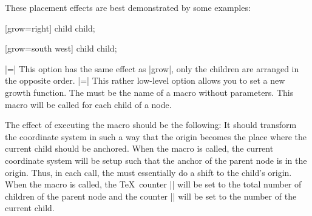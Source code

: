 \begin{itemize}
  These placement effects are best demonstrated by some examples:
\begin{codeexample}[]
\tikz {} [grow=right] child child;
\end{codeexample}

\begin{codeexample}[]
\tikz {} [grow=south west] child child;
\end{codeexample}

\begin{codeexample}[]
\end{codeexample}

\begin{codeexample}[]
\end{codeexample}

\begin{codeexample}[]
\end{codeexample}

  |=|
  This option has the same effect as |grow|, only the children are
  arranged in the opposite order.
  |=|
  This rather low-level option allows you to set a new growth
  function. The  must be the name of a macro without
  parameters. This macro will be called for each child of a node.

  The effect of executing the macro should be the following: It should
  transform the coordinate system in such a way that the origin
  becomes the place where the current child should be anchored. When
  the macro is called, the current coordinate system will be setup
  such that the anchor of the parent node is in the origin. Thus, in
  each call, the  must essentially do a shift to the
  child's origin. When the macro is called, the \TeX\ counter
  |\tikznumberofchildren| will be set to the total number of children
  of the parent node and the counter |\tikznumberofcurrentchild| will
  be set to the number of the current child.


\end{itemize}

